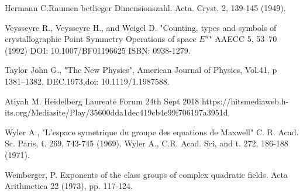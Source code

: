 \documentclass[a4paper,9pt]{article}
\begin{document}
\begin{thebibliography}{99}
 Hermann C.Raumen betlieger Dimensionszahl. Acta. Cryst. 2, 139-145 (1949). 

 Veysseyre R., Veysseyre H., and Weigel D. "Counting, types and symbols of crystallographic Point Symmetry Operations of space $E^{n}$" AAECC 5, 53--70 (1992) DOI: 10.1007/BF01196625 ISBN: 0938-1279.

 Taylor John G., "The New Physics", American Journal of Physics, Vol.41, p 1381--1382, DEC.1973,doi: 10.1119/1.1987588. 

 Atiyah M. Heidelberg Laureate Forum 24th Sept 2018 https://hitsmediaweb.h-its.org/Mediasite/Play/35600dda1dec419cb4e99f706197a3951d.




 Wyler A., "L'espace symetrique du groupe des equations de Maxwell" C. R. Acad. Sc. Paris, t. 269, 743-745 (1969). Wyler A., C.R. Acad. Sci, and t. 272, 186-188 (1971).













 Weinberger, P. Exponents of the class groups of complex quadratic fields. Acta Arithmetica 22 (1973), pp. 117-124.




\end{thebibliography}
\end{document}
